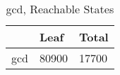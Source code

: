 \begin{table}
\centering
\caption{gcd, Reachable States}
\label{gcd_reach}
\begin{tabular}{lll}
\toprule
{} &   Leaf &  Total \\
\midrule
gcd &  80900 &  17700 \\
\bottomrule
\end{tabular}
\end{table}
